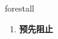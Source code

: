 
\begin{frame}
{\huge forestall}
\begin{center}
\begin{enumerate}\Large
  \item \textbf{预先阻止}
\end{enumerate}
\end{center}
\end{frame}
